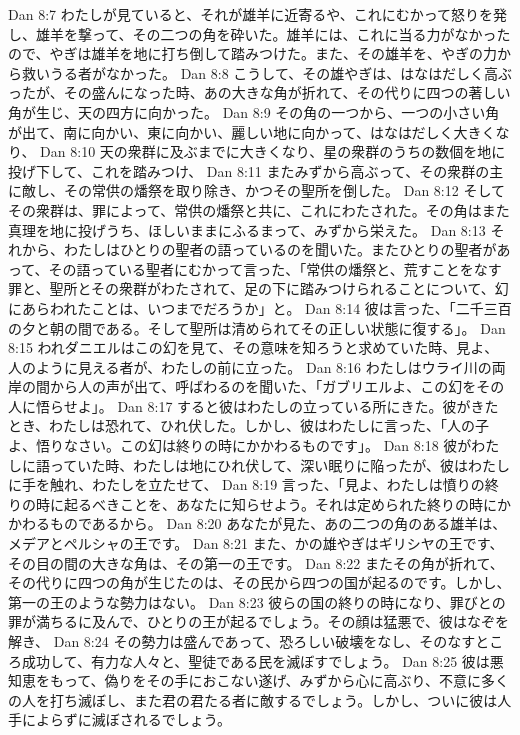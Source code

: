 Dan 8:7  わたしが見ていると、それが雄羊に近寄るや、これにむかって怒りを発し、雄羊を撃って、その二つの角を砕いた。雄羊には、これに当る力がなかったので、やぎは雄羊を地に打ち倒して踏みつけた。また、その雄羊を、やぎの力から救いうる者がなかった。
Dan 8:8  こうして、その雄やぎは、はなはだしく高ぶったが、その盛んになった時、あの大きな角が折れて、その代りに四つの著しい角が生じ、天の四方に向かった。
Dan 8:9  その角の一つから、一つの小さい角が出て、南に向かい、東に向かい、麗しい地に向かって、はなはだしく大きくなり、
Dan 8:10  天の衆群に及ぶまでに大きくなり、星の衆群のうちの数個を地に投げ下して、これを踏みつけ、
Dan 8:11  またみずから高ぶって、その衆群の主に敵し、その常供の燔祭を取り除き、かつその聖所を倒した。
Dan 8:12  そしてその衆群は、罪によって、常供の燔祭と共に、これにわたされた。その角はまた真理を地に投げうち、ほしいままにふるまって、みずから栄えた。
Dan 8:13  それから、わたしはひとりの聖者の語っているのを聞いた。またひとりの聖者があって、その語っている聖者にむかって言った、「常供の燔祭と、荒すことをなす罪と、聖所とその衆群がわたされて、足の下に踏みつけられることについて、幻にあらわれたことは、いつまでだろうか」と。
Dan 8:14  彼は言った、「二千三百の夕と朝の間である。そして聖所は清められてその正しい状態に復する」。
Dan 8:15  われダニエルはこの幻を見て、その意味を知ろうと求めていた時、見よ、人のように見える者が、わたしの前に立った。
Dan 8:16  わたしはウライ川の両岸の間から人の声が出て、呼ばわるのを聞いた、「ガブリエルよ、この幻をその人に悟らせよ」。
Dan 8:17  すると彼はわたしの立っている所にきた。彼がきたとき、わたしは恐れて、ひれ伏した。しかし、彼はわたしに言った、「人の子よ、悟りなさい。この幻は終りの時にかかわるものです」。
Dan 8:18  彼がわたしに語っていた時、わたしは地にひれ伏して、深い眠りに陥ったが、彼はわたしに手を触れ、わたしを立たせて、
Dan 8:19  言った、「見よ、わたしは憤りの終りの時に起るべきことを、あなたに知らせよう。それは定められた終りの時にかかわるものであるから。
Dan 8:20  あなたが見た、あの二つの角のある雄羊は、メデアとペルシャの王です。
Dan 8:21  また、かの雄やぎはギリシヤの王です、その目の間の大きな角は、その第一の王です。
Dan 8:22  またその角が折れて、その代りに四つの角が生じたのは、その民から四つの国が起るのです。しかし、第一の王のような勢力はない。
Dan 8:23  彼らの国の終りの時になり、罪びとの罪が満ちるに及んで、ひとりの王が起るでしょう。その顔は猛悪で、彼はなぞを解き、
Dan 8:24  その勢力は盛んであって、恐ろしい破壊をなし、そのなすところ成功して、有力な人々と、聖徒である民を滅ぼすでしょう。
Dan 8:25  彼は悪知恵をもって、偽りをその手におこない遂げ、みずから心に高ぶり、不意に多くの人を打ち滅ぼし、また君の君たる者に敵するでしょう。しかし、ついに彼は人手によらずに滅ぼされるでしょう。
